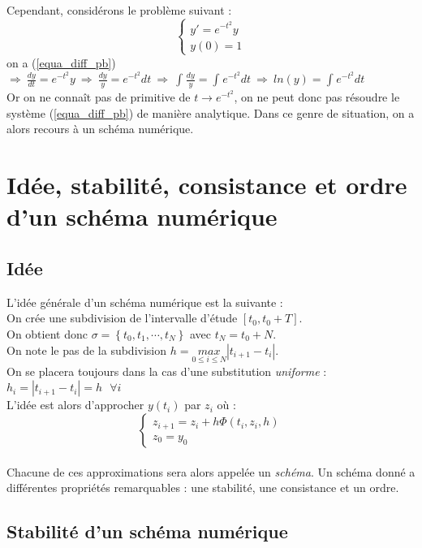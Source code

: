 \documentclass[a4paper,10pt]{report}
\begin{document}
\indent Cependant, considérons le problème suivant :
\begin{equation}
\label{equa_diff_pb}
\left\lbrace
\begin{array}{l}
y'=e^{-t^2}y \\
y(0)=1
\end{array}\right.
\end{equation}
on a (\ref{equa_diff_pb}) $\Rightarrow \ \frac{dy}{dt} = e^{-t^2}y \ \Rightarrow \ \frac{dy}{y} = e^{-t^2}dt \ \Rightarrow \ \int_{}^{} \frac{dy}{y} = \int_{}^{} e^{-t^2}dt \ \Rightarrow \ ln(y) = \int_{}^{} e^{-t^2}dt $\\
Or on ne connaît pas de primitive de $t \longrightarrow e^{-t^2}$, on ne peut donc pas résoudre le système (\ref{equa_diff_pb}) de manière analytique. Dans ce genre de situation, on a alors recours à un schéma numérique.

\newpage
\section{Idée, stabilité, consistance et ordre d'un schéma numérique}
\subsection{Idée}
L'idée générale d'un schéma numérique est la suivante :\\
On crée une subdivision de l'intervalle d'étude $[t_0,t_0+T]$.\\
On obtient donc $\sigma = \left\lbrace t_0,t_1,\cdots ,t_N \right\rbrace$ avec $t_N=t_0+N$.\\
On note le pas de la subdivision $h=\underset{0\leq i \leq N}{max} |t_{i+1}-t_i|$.\\
On se placera toujours dans la cas d'une substitution \textit{uniforme} : $h_i=|t_{i+1}-t_i|=h \ \ \ \forall i$\\
L'idée est alors d'approcher $y(t_i)$ par $z_i$ où :
\begin{equation}
\left\lbrace
\begin{array}{l}
z_{i+1}=z_i+h\Phi (t_i,z_i,h) \\
z_0=y_0
\end{array}\right.
\end{equation}\\
Chacune de ces approximations sera alors appelée un \textit{schéma}. Un schéma donné a différentes propriétés remarquables : une stabilité, une consistance et un ordre.

\subsection{Stabilité d'un schéma numérique}
\end{document}
